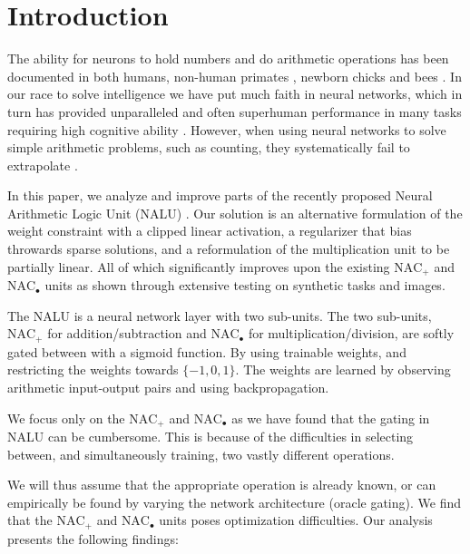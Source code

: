 \section{Introduction}

The ability for neurons to hold numbers and do arithmetic operations has been documented in both humans, non-human primates \cite{nieder-neuronal-number}, newborn chicks \cite{rugani-arithmetic-chicks} and bees \cite{gallistel-numbers-in-brain}.
In our race to solve intelligence we have put much faith in neural networks, which in turn has provided unparalleled and often superhuman performance in many tasks requiring high cognitive ability \cite{natureGo,googleNMT,resnet}.
However, when using neural networks to solve simple arithmetic problems, such as counting, they systematically fail to extrapolate \cite{stillNotSystematic,suzgun2019evaluating,trask-nalu}.

In this paper, we analyze and improve parts of the recently proposed Neural Arithmetic Logic Unit (NALU) \cite{trask-nalu}. Our solution is an alternative formulation of the weight constraint with a clipped linear activation, a regularizer that bias throwards sparse solutions, and a reformulation of the multiplication unit to be partially linear. All of which significantly improves upon the existing $\text{NAC}_{+}$ and $\text{NAC}_{\bullet}$ units as shown through extensive testing on synthetic tasks and images.

The NALU is a neural network layer with two sub-units. The two sub-units, $\text{NAC}_{+}$ for addition/subtraction and $\text{NAC}_{\bullet}$ for multiplication/division, are softly gated between with a sigmoid function. By using trainable weights, and restricting the weights towards $\{-1,0,1\}$. The weights are learned by observing arithmetic input-output pairs and using backpropagation\cite{rumelhart1986learning}.

We focus only on the $\text{NAC}_{+}$ and $\text{NAC}_{\bullet}$ as we have found that the gating in NALU can be cumbersome. This is because of the difficulties in selecting between, and simultaneously training, two vastly different operations. 

We will thus assume that the appropriate operation is already known, or can empirically be found by varying the network architecture (oracle gating). We find that the $\text{NAC}_{+}$ and $\text{NAC}_{\bullet}$ units poses optimization difficulties. Our analysis presents the following findings:

